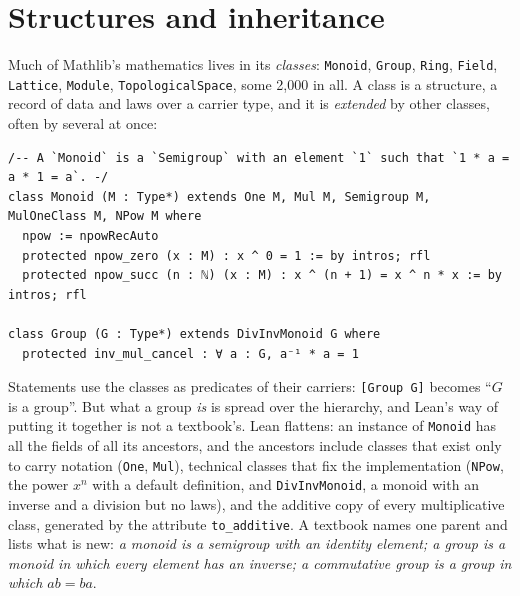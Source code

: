 \documentclass{easychair}
\newcommand{\ttt}[1]{\texttt{#1}}
\begin{document}
\section{Structures and inheritance}
\label{sec:structures}

Much of Mathlib's mathematics lives in its \emph{classes}: \ttt{Monoid}, \ttt{Group},
\ttt{Ring}, \ttt{Field}, \ttt{Lattice}, \ttt{Module}, \ttt{TopologicalSpace}, some 2,000 in
all. A class is a structure, a record of data and laws over a carrier type, and it is
\emph{extended} by other classes, often by several at once:
\begin{lstlisting}
/-- A `Monoid` is a `Semigroup` with an element `1` such that `1 * a = a * 1 = a`. -/
class Monoid (M : Type*) extends One M, Mul M, Semigroup M, MulOneClass M, NPow M where
  npow := npowRecAuto
  protected npow_zero (x : M) : x ^ 0 = 1 := by intros; rfl
  protected npow_succ (n : ℕ) (x : M) : x ^ (n + 1) = x ^ n * x := by intros; rfl

class Group (G : Type*) extends DivInvMonoid G where
  protected inv_mul_cancel : ∀ a : G, a⁻¹ * a = 1
\end{lstlisting}
Statements use the classes as predicates of their carriers: \ttt{[Group G]} becomes ``$G$ is a
group''. But what a group \emph{is} is spread over the hierarchy, and Lean's way of putting it
together is not a textbook's. Lean flattens: an instance of \ttt{Monoid} has all the fields of all
its ancestors, and the ancestors include classes that exist only to carry notation (\ttt{One},
\ttt{Mul}), technical classes that fix the implementation (\ttt{NPow}, the power $x^n$ with a
default definition, and \ttt{DivInvMonoid}, a monoid with an inverse and a division but no
laws), and the additive copy of every multiplicative class, generated by the attribute
\ttt{to\_additive}. A textbook names one parent and lists what is new: \emph{a monoid is a
semigroup with an identity element; a group is a monoid in which every element has an
inverse; a commutative group is a group in which $ab = ba$}.
\end{document}
